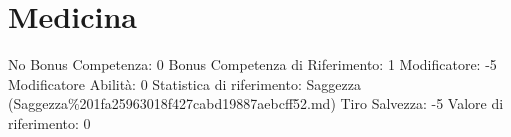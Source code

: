 \section{Medicina}\label{medicina}

\begin{description}
\tightlist
\item[Tags: ABI]
No Bonus Competenza: 0 Bonus Competenza di Riferimento: 1 Modificatore:
-5 Modificatore Abilità: 0 Statistica di riferimento: Saggezza
(Saggezza\%201fa25963018f427cabd19887aebcff52.md) Tiro Salvezza: -5
Valore di riferimento: 0
\end{description}
